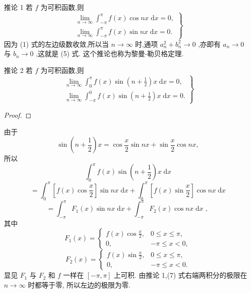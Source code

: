 推论 1 若 \(f\) 为可积函数,则
\[
\left. \begin{array}{l} \mathop{\lim }\limits_{{n \rightarrow  \infty }}{\int }_{-\pi }^{\pi }f\left( x\right) \cos {nx}\mathrm{\;d}x = 0, \\  \mathop{\lim }\limits_{{n \rightarrow  \infty }}{\int }_{-\pi }^{\pi }f\left( x\right) \sin {nx}\mathrm{\;d}x = 0. \end{array}\right\}   \tag{5}
\]
因为 (1) 式的左边级数收敛,所以当 \(n \rightarrow  \infty\) 时,通项 \({a}_{n}^{2} + {b}_{n}^{2} \rightarrow  0\) ,亦即有 \({a}_{n} \rightarrow  0\) 与 \({b}_{n} \rightarrow  0\) ,这就是 (5) 式. 这个推论也称为黎曼-勒贝格定理.

推论 2 若 \(f\) 为可积函数,则
\[
\left. \begin{array}{l} \mathop{\lim }\limits_{{n \rightarrow  \infty }}{\int }_{0}^{\pi }f\left( x\right) \sin \left( {n + \frac{1}{2}}\right) x\mathrm{\;d}x = 0, \\  \mathop{\lim }\limits_{{n \rightarrow  \infty }}{\int }_{-\pi }^{0}f\left( x\right) \sin \left( {n + \frac{1}{2}}\right) x\mathrm{\;d}x = 0. \end{array}\right\}   \tag{6}
\]
\begin{proof}

\end{proof}
由于
\[
\sin \left( {n + \frac{1}{2}}\right) x = \cos \frac{x}{2}\sin {nx} + \sin \frac{x}{2}\cos {nx},
\]
所以
\[
{\int }_{0}^{\pi }f\left( x\right) \sin \left( {n + \frac{1}{2}}\right) x\mathrm{\;d}x
\]
\[
= {\int }_{0}^{\pi }\left\lbrack  {f\left( x\right) \cos \frac{x}{2}}\right\rbrack  \sin {nx}\mathrm{\;d}x + {\int }_{0}^{\pi }\left\lbrack  {f\left( x\right) \sin \frac{x}{2}}\right\rbrack  \cos {nx}\mathrm{\;d}x
\]
\[
= {\int }_{-\pi }^{\pi }{F}_{1}\left( x\right) \sin {nx}\mathrm{\;d}x + {\int }_{-\pi }^{\pi }{F}_{2}\left( x\right) \cos {nx}\mathrm{\;d}x\text{ , } \tag{7}
\]
其中
\[
{F}_{1}\left( x\right)  = \left\{  \begin{matrix} f\left( x\right) \cos \frac{x}{2}, & 0 \leq  x \leq  \pi , \\  0, &  - \pi  \leq  x < 0, \end{matrix}\right.
\]
\[
{F}_{2}\left( x\right)  = \left\{  \begin{matrix} f\left( x\right) \sin \frac{x}{2}, & 0 \leq  x \leq  \pi , \\  0, &  - \pi  \leq  x < 0. \end{matrix}\right.
\]
显见 \({F}_{1}\) 与 \({F}_{2}\) 和 \(f\) 一样在 \(\left\lbrack  {-\pi ,\pi }\right\rbrack\) 上可积. 由推论 1,(7) 式右端两积分的极限在 \(n \rightarrow  \infty\) 时都等于零, 所以左边的极限为零.

